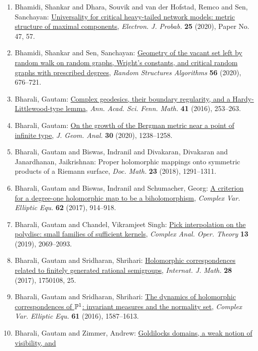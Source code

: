 \begin{enumerate}
\item Bhamidi, Shankar and Dhara, Souvik and van der Hofstad, Remco
and Sen, Sanchayan: \href{https://doi.org/10.1214/19-ejp408}{Universality for critical heavy-tailed network models: metric
structure of maximal components}, \emph{Electron. J. Probab.} {\bf 25} (2020), Paper No. 47, 57.
\item Bhamidi, Shankar and Sen, Sanchayan: \href{https://doi.org/10.1002/rsa.20880}{Geometry of the vacant set left by random walk on random
graphs, {W}right's constants, and critical random graphs with
prescribed degrees}, \emph{Random Structures Algorithms} {\bf 56} (2020), 676--721.
\item Bharali, Gautam: \href{https://doi.org/10.5186/aasfm.2016.4116}{Complex geodesics, their boundary regularity, and a
{H}ardy-{L}ittlewood-type lemma}, \emph{Ann. Acad. Sci. Fenn. Math.} {\bf 41} (2016), 253--263.
\item Bharali, Gautam: \href{https://doi.org/10.1007/s12220-019-00342-9}{On the growth of the {B}ergman metric near a point of infinite
type}, \emph{J. Geom. Anal.} {\bf 30} (2020), 1238--1258.
\item Bharali, Gautam and Biswas, Indranil and Divakaran, Divakaran
and Janardhanan, Jaikrishnan: Proper holomorphic mappings onto symmetric products of a
{R}iemann surface, \emph{Doc. Math.} {\bf 23} (2018), 1291--1311.
\item Bharali, Gautam and Biswas, Indranil and Schumacher, Georg: \href{https://doi.org/10.1080/17476933.2016.1252342}{A criterion for a degree-one holomorphic map to be a
biholomorphism}, \emph{Complex Var. Elliptic Equ.} {\bf 62} (2017), 914--918.
\item Bharali, Gautam and Chandel, Vikramjeet Singh: \href{https://doi.org/10.1007/s11785-017-0701-5}{Pick interpolation on the polydisc: small families of
sufficient kernels}, \emph{Complex Anal. Oper. Theory} {\bf 13} (2019), 2069--2093.
\item Bharali, Gautam and Sridharan, Shrihari: \href{https://doi.org/10.1142/S0129167X17501087}{Holomorphic correspondences related to finitely generated
rational semigroups}, \emph{Internat. J. Math.} {\bf 28} (2017), 1750108, 25.
\item Bharali, Gautam and Sridharan, Shrihari: \href{https://doi.org/10.1080/17476933.2016.1185419}{The dynamics of holomorphic correspondences of {$\Bbb P^1$}:
invariant measures and the normality set}, \emph{Complex Var. Elliptic Equ.} {\bf 61} (2016), 1587--1613.
\item Bharali, Gautam and Zimmer, Andrew: \href{https://doi.org/10.1016/j.aim.2017.02.005}{Goldilocks domains, a weak notion of visibility, and
}
\end{enumerate}
